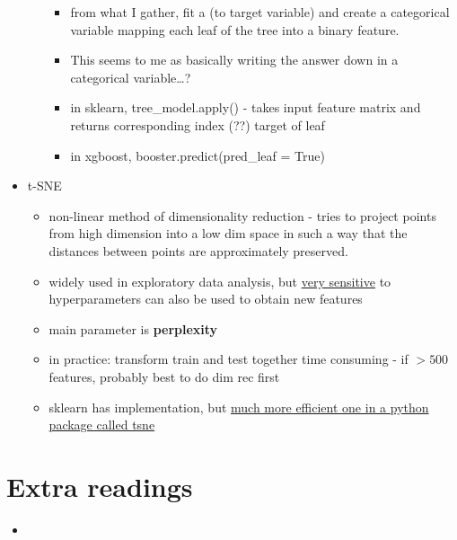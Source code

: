 \documentclass[a4paper]{report}
\newcommand{\brown}{\color{brown}}
\begin{document}
\begin{itemize}
\begin{itemize}
\begin{itemize}
	  \item from what I gather, fit a (to target variable) and create a categorical variable mapping each leaf of the tree into a binary feature.
	  \item {\color{red} This seems to me as basically writing the answer down in a categorical variable\dots?}
	  \item in sklearn, {\brown tree\_model.apply()} - takes input feature matrix and returns corresponding index (??) target of leaf
	  \item in xgboost, {\brown booster.predict(pred\_leaf = True)}
	\end{itemize}
    \end{itemize}
  \item t-SNE
    \begin{itemize}
      \item non-linear method of dimensionality reduction - tries to project points from high dimension into a low dim space in such a way that the distances between points are approximately preserved.
      \item widely used in exploratory data analysis, but \underline{very sensitive} to hyperparameters
        \subitem can also be used to obtain new features
      \item main parameter is {\bf perplexity}
      \item in practice:
	\subitem transform train and test together
	\subitem time consuming - if $>500$ features, probably best to do dim rec first
      \item sklearn has implementation, but \underline{much more efficient one in a python package called tsne}
    \end{itemize}
\end{itemize}

\section{Extra readings}
\begin{itemize}
  \item
\end{itemize}
\end{document}
